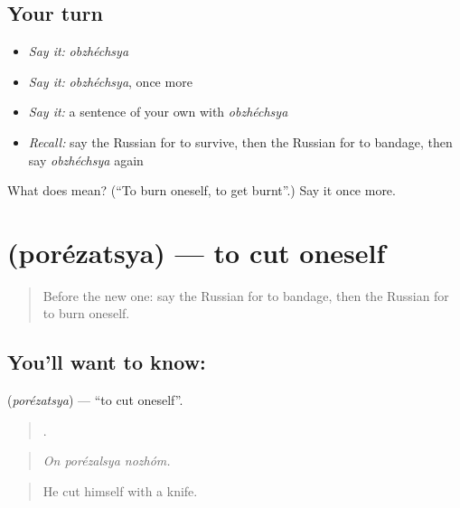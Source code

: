 \subsection*{Your turn}
\begin{itemize}
\raggedright
  \item \emph{Say it:} \emph{obzhéchsya}
  \item \emph{Say it:} \emph{obzhéchsya}, once more
  \item \emph{Say it:} a sentence of your own with \emph{obzhéchsya}
  \item \emph{Recall:} say the Russian for to survive, then the Russian for to bandage, then say \emph{obzhéchsya} again
\end{itemize}

\begin{tcolorbox}[breakable,colback=teal!4,colframe=teal!35!black,title={Before you move on}]
What does  mean? (\textquotedblleft{}To burn oneself, to get burnt\textquotedblright{}.) Say it once more.
\end{tcolorbox}
\section[\texorpdfstring{\ru{порезаться} (porézatsya)}{порезаться (porézatsya)}]{ (porézatsya) — to cut oneself}

\label{lesson:RU-C302-porezatsya}



\begin{quote}
Before the new one: say the Russian for to bandage, then the Russian for to burn oneself.
\end{quote}

\subsection*{You'll want to know: }
\textbf{} (\emph{porézatsya}) — \textquotedblleft{}to cut oneself\textquotedblright{}.

\begin{quote}
  .
\end{quote}

\begin{quote}
\emph{On porézalsya nozhóm.}
\end{quote}

\begin{quote}
He cut himself with a knife.
\end{quote}


